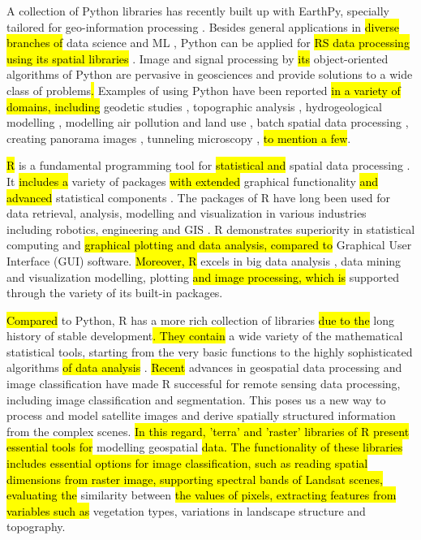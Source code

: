 \documentclass[jimaging,article,submit,pdftex,moreauthors]{Definitions/mdpi}
\begin{document}
A collection of Python libraries \cite{ROBERTS2022105192,CHEN2022105362} has recently built up with EarthPy, specially tailored for\hl{ }geo-information processing \cite{wasser2019EarthPyAP}. Besides general applications in \hl{diverse branches of }data science and ML \cite{8757088,DebeirDecaestecker,Debeir2008,9719489}, Python can be applied for \hl{RS data processing using its spatial libraries} \cite{Ahmed}. Image and signal processing by \hl{its} object-oriented algorithms of Python are pervasive in geosciences and provide solutions to a wide class of problems\hl{. }Examples of using Python have been reported \hl{in a variety of domains, including} geodetic studies \cite{Zhou2021GPS2spaceAO}, topographic analysis \cite{9254627}, hydrogeological modelling \cite{Mogaji}, modelling air pollution and land use \cite{Maetal2020}, batch spatial data processing \cite{6057428}, creating panorama images \cite{JASKOLKA2019e02560}, tunneling microscopy \cite{BASTIDAS2021150821}, \hl{to mention a few}. 

\hl{R }is a fundamental programming tool for \hl{statistical and }spatial data processing \cite{RCoreTeam}. It \hl{ includes a} variety of packages \hl{ with extended} graphical functionality\hl{ and advanced} statistical components \cite{Murrell}. The packages of R have long been used for data retrieval, analysis, modelling and visualization in various industries including robotics, engineering and GIS \cite{7847824,Lemenkova2022a,9378399,Lemenkova202216,9390011}. R demonstrates\hl{ }superiority in statistical computing and \hl{graphical plotting and data analysis, compared to} Graphical User Interface (GUI) software. \hl{Moreover, R} excels in big data analysis \cite{7570960,9752002,6597171}, data mining \cite{7978404} and visualization \cite{Lemenkova201991}\hl{ }modelling, plotting\hl{ and image processing, which is }supported through the variety of its built-in packages. 

\hl{Compared} to Python, R has a more\hl{ }rich collection of libraries\hl{ due to the }long history of stable development\hl{. They contain} a wide variety of the mathematical statistical tools, starting from the very basic functions to the highly sophisticated algorithms \hl{of data analysis} \cite{9675988}. \hl{Recent} advances in geospatial data processing \cite{8226275} and image classification \cite{9844952,8117873} have made R successful for remote sensing data processing, including image classification and segmentation. This poses us a new way to process and model satellite images and derive spatially structured information from the complex scenes. \hl{In this regard, 'terra' and 'raster' libraries of R present essential tools for }modelling geospatial \hl{data. The functionality of these libraries includes essential options for image classification, such as reading spatial dimensions from raster image, supporting spectral bands of Landsat scenes, evaluating the} similarity between \hl{the values of pixels, extracting features from variables such as} vegetation types, variations in landscape structure and topography. 
\end{document}
